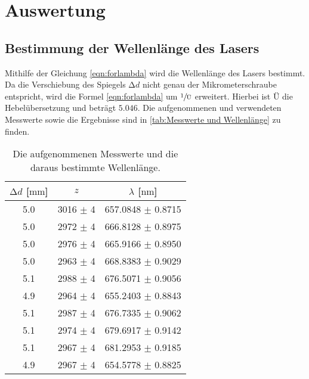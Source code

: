 \section{Auswertung}
\label{sec:Auswertung}

\subsection{Bestimmung der Wellenlänge des Lasers}
\label{subsec:Wellenlänge}

Mithilfe der Gleichung \eqref{eqn:forlambda} wird die Wellenlänge des Lasers bestimmt.
Da die Verschiebung des Spiegels $\increment d$ nicht genau der Mikrometerschraube entspricht, wird die Formel \eqref{eqn:forlambda} um $\sfrac{1}{\text{Ü}}$ erweitert.
Hierbei ist $Ü$ die Hebelübersetzung und beträgt $5.046$.
Die aufgenommenen und verwendeten Messwerte sowie die Ergebnisse sind in \autoref{tab:Messwerte und Wellenlänge} zu finden.

\begin{table}
  \centering
  \caption{Die aufgenommenen Messwerte und die daraus bestimmte Wellenlänge.}
  \label{tab:Messwerte und Wellenlänge}
  \begin{tabular}{c c c}
    \toprule
    {$\increment d$ [$\si{\milli\metre}$]} & {$z$} & {$\lambda$ [$\si{\nano\metre}$]} \\
    \midrule
    5.0     &       3016 $\pm$ 4    &   657.0848 $\pm$ 0.8715\\
    5.0     &       2972 $\pm$ 4    &   666.8128 $\pm$ 0.8975\\
    5.0     &       2976 $\pm$ 4    &   665.9166 $\pm$ 0.8950\\
    5.0     &       2963 $\pm$ 4    &   668.8383 $\pm$ 0.9029\\
    5.1     &       2988 $\pm$ 4    &   676.5071 $\pm$ 0.9056\\
    4.9     &       2964 $\pm$ 4    &   655.2403 $\pm$ 0.8843\\
    5.1     &       2987 $\pm$ 4    &   676.7335 $\pm$ 0.9062\\
    5.1     &       2974 $\pm$ 4    &   679.6917 $\pm$ 0.9142\\
    5.1     &       2967 $\pm$ 4    &   681.2953 $\pm$ 0.9185\\
    4.9     &       2967 $\pm$ 4    &   654.5778 $\pm$ 0.8825\\
    \bottomrule
  \end{tabular}
\end{table}

